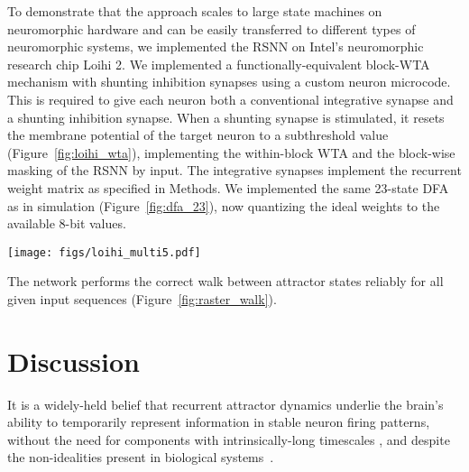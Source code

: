 To demonstrate that the approach scales to large state machines on neuromorphic hardware and can be easily transferred to different types of neuromorphic systems, we implemented the RSNN on Intel's neuromorphic research chip Loihi 2. We implemented a functionally-equivalent block-WTA mechanism with shunting inhibition synapses using a custom neuron microcode. This is required to give each neuron both a conventional integrative synapse and a shunting inhibition synapse.
When a shunting synapse is stimulated, it resets the membrane potential of the target neuron to a subthreshold value \mbox{(Figure \ref{fig:loihi_wta})}, implementing the within-block WTA and the block-wise masking of the RSNN by input.
The integrative synapses implement the recurrent weight matrix as specified in Methods.
We implemented the same 23-state DFA as in simulation \mbox{(Figure \ref{fig:dfa_23})}, now quantizing the ideal weights to the available 8-bit values. 
\begin{figure*}
\centering
\texttt{[image: figs/loihi\_multi5.pdf]}
\caption{
The 23-state DFA on Loihi 2. \textbf{a)} The input symbol to the network at any time, and \textbf{b)} the corresponding input vectors, which mask the network activity. \textbf{c)} A spike raster plot of the first 64 neurons. The shunting-inhibition WTA mechanism ensures that only one neuron in every block may spike at once (see Methods). \textbf{d)} Kernel firing-rate estimates of each $q$ and $b$ state, choosing arbitrarily that 1 time step on Loihi represents \qty{1}{ms}. The sequence of inputs given corresponds to the binary representation of the number 92. The RSNN halts in the $q_0$ state, indicating correctly that 92 is divisible by 23. \textbf{e)} For all sequences of inputs, the correct walk between attractor states is performed.}
\label{fig:raster_walk}
\end{figure*}
The network performs the correct walk between attractor states reliably for all given input sequences \mbox{(Figure \ref{fig:raster_walk})}.




\section{Discussion}
It is a widely-held belief that recurrent attractor dynamics underlie the brain's ability to temporarily represent information in stable neuron firing patterns, without the need for components with intrinsically-long timescales \cite{dagostino_denram_2024}, and despite the non-idealities present in biological systems~\cite{little_existence_1974, rolls_mechanisms_2013, chaudhuri_computational_2016, schneidman_weak_2006, khona_attractor_2022}.


